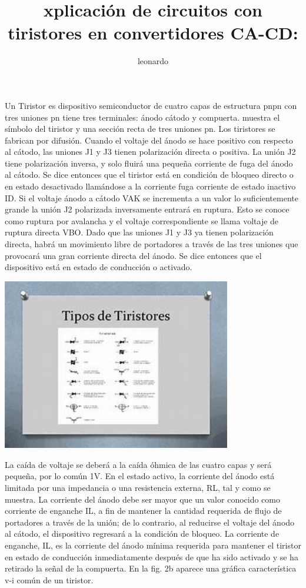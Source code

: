 \documentclass[12pt,a4paper]{article}
\author{leonardo}
\title{xplicación de circuitos con tiristores en convertidores CA-CD:}
\begin{document}
Un Tiristor es dispositivo semiconductor de cuatro capas de estructura pnpn con tres uniones pn tiene tres terminales: ánodo cátodo y compuerta. muestra el símbolo del tiristor y una sección recta de tres uniones pn. Los tiristores se fabrican por difusión.
Cuando el voltaje del ánodo se hace positivo con respecto al cátodo, las uniones J1 y J3 tienen polarización directa o positiva. La unión J2 tiene polarización inversa, y solo fluirá una pequeña corriente de fuga del ánodo al cátodo. Se dice entonces que el tiristor está en condición de bloqueo directo o en estado desactivado llamándose a la corriente fuga corriente de estado inactivo ID. Si el voltaje ánodo a cátodo VAK se incrementa a un valor lo suficientemente grande la unión J2 polarizada inversamente entrará en ruptura. Esto se conoce como ruptura por avalancha y el voltaje correspondiente se llama voltaje de ruptura directa VBO. Dado que las uniones J1 y J3 ya tienen polarización directa, habrá un movimiento libre de portadores a través de las tres uniones que provocará una gran corriente directa del ánodo. Se dice entonces que el dispositivo está en estado de conducción o activado.
\begin{center}
\includegraphics[width=10cm]{1.jpg}   
\end{center}
\begin{flushleft}
 La caída de voltaje se deberá a la caída óhmica de las cuatro capas y será pequeña, por lo común 1V. En el estado activo, la corriente del ánodo está limitada por una impedancia o una resistencia externa, RL, tal y como se muestra.
La corriente del ánodo debe ser mayor que un valor conocido como corriente de enganche IL, a fin de mantener la cantidad requerida de flujo de portadores a través de la unión; de lo contrario, al reducirse el voltaje del ánodo al cátodo, el dispositivo regresará a la condición de bloqueo. La corriente de enganche, IL, es la corriente del ánodo mínima requerida para mantener el tiristor en estado de conducción inmediatamente después de que ha sido activado y se ha retirado la señal de la compuerta. En la fig. 2b aparece una gráfica característica v-i común de un tiristor.  

\end{flushleft}
\end{document}
